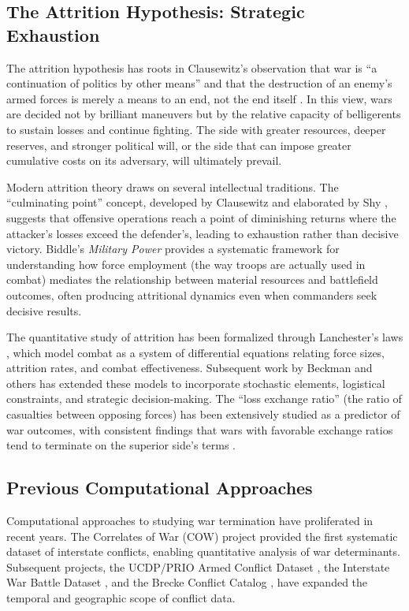 \subsection{The Attrition Hypothesis: Strategic Exhaustion}

The attrition hypothesis has roots in Clausewitz's observation that war is ``a continuation of politics by other means'' and that the destruction of an enemy's armed forces is merely a means to an end, not the end itself \citep{clausewitz1832}. In this view, wars are decided not by brilliant maneuvers but by the relative capacity of belligerents to sustain losses and continue fighting. The side with greater resources, deeper reserves, and stronger political will, or the side that can impose greater cumulative costs on its adversary, will ultimately prevail.

Modern attrition theory draws on several intellectual traditions. The ``culminating point'' concept, developed by Clausewitz and elaborated by Shy \citep{shy1976}, suggests that offensive operations reach a point of diminishing returns where the attacker's losses exceed the defender's, leading to exhaustion rather than decisive victory. Biddle's \textit{Military Power} \citep{biddle2004} provides a systematic framework for understanding how force employment (the way troops are actually used in combat) mediates the relationship between material resources and battlefield outcomes, often producing attritional dynamics even when commanders seek decisive results.

The quantitative study of attrition has been formalized through Lanchester's laws \citep{lanchester1916}, which model combat as a system of differential equations relating force sizes, attrition rates, and combat effectiveness. Subsequent work by Beckman \citep{beckman1995} and others has extended these models to incorporate stochastic elements, logistical constraints, and strategic decision-making. The ``loss exchange ratio'' (the ratio of casualties between opposing forces) has been extensively studied as a predictor of war outcomes, with consistent findings that wars with favorable exchange ratios tend to terminate on the superior side's terms \citep{heginbotham2015}.

\subsection{Previous Computational Approaches}

Computational approaches to studying war termination have proliferated in recent years. The Correlates of War (COW) project \citep{singer1972} provided the first systematic dataset of interstate conflicts, enabling quantitative analysis of war determinants. Subsequent projects, the UCDP/PRIO Armed Conflict Dataset \citep{gleditsch2002}, the Interstate War Battle Dataset \citep{rester2019}, and the Brecke Conflict Catalog \citep{brecke1999}, have expanded the temporal and geographic scope of conflict data.

